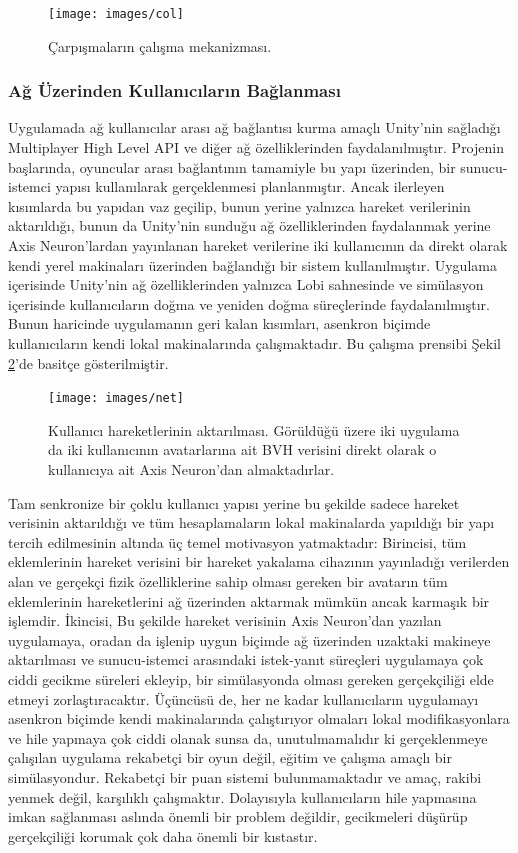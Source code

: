 \documentclass[a4paper, 12pt, titlepage]{article}
\begin{document}
\begin{figure}[ht!]
    \centering
        \texttt{[image: images/col]}
    \caption{Çarpışmaların çalışma mekanizması.}
    \label{col}
\end{figure}

\subsubsection{Ağ Üzerinden Kullanıcıların Bağlanması}
Uygulamada ağ kullanıcılar arası ağ bağlantısı kurma amaçlı Unity’nin sağladığı Multiplayer High
Level API ve diğer ağ özelliklerinden faydalanılmıştır. Projenin başlarında, oyuncular arası
bağlantının tamamiyle bu yapı üzerinden, bir sunucu-istemci yapısı kullanılarak gerçeklenmesi
planlanmıştır. Ancak ilerleyen kısımlarda bu yapıdan vaz geçilip, bunun yerine yalnızca hareket
verilerinin aktarıldığı, bunun da Unity’nin sunduğu ağ özelliklerinden faydalanmak yerine Axis
Neuron’lardan yayınlanan hareket verilerine iki kullanıcının da direkt olarak kendi yerel
makinaları üzerinden bağlandığı bir sistem kullanılmıştır. Uygulama içerisinde Unity’nin ağ
özelliklerinden yalnızca Lobi sahnesinde ve simülasyon içerisinde kullanıcıların doğma ve yeniden
doğma süreçlerinde faydalanılmıştır. Bunun haricinde uygulamanın geri kalan kısımları, asenkron
biçimde kullanıcıların kendi lokal makinalarında çalışmaktadır. Bu çalışma prensibi Şekil
\ref{net}’de basitçe gösterilmiştir.

\begin{figure}[ht!]
    \centering
        \texttt{[image: images/net]}
    \caption{Kullanıcı hareketlerinin aktarılması. Görüldüğü üzere iki uygulama da iki kullanıcının
             avatarlarına ait BVH verisini direkt olarak o kullanıcıya ait Axis Neuron’dan
             almaktadırlar.}
    \label{net}
\end{figure}

Tam senkronize bir çoklu kullanıcı yapısı yerine bu şekilde sadece hareket verisinin aktarıldığı ve
tüm hesaplamaların lokal makinalarda yapıldığı bir yapı tercih edilmesinin altında üç temel
motivasyon yatmaktadır: Birincisi, tüm eklemlerinin hareket verisini bir hareket yakalama cihazının
yayınladığı verilerden alan ve gerçekçi fizik özelliklerine sahip olması gereken bir avatarın tüm
eklemlerinin hareketlerini ağ üzerinden aktarmak mümkün ancak karmaşık bir işlemdir. İkincisi, Bu
şekilde hareket verisinin Axis Neuron’dan yazılan uygulamaya, oradan da işlenip uygun biçimde ağ
üzerinden uzaktaki makineye aktarılması ve sunucu-istemci arasındaki istek-yanıt süreçleri
uygulamaya çok ciddi gecikme süreleri ekleyip, bir simülasyonda olması gereken gerçekçiliği elde
etmeyi zorlaştıracaktır. Üçüncüsü de, her ne kadar kullanıcıların uygulamayı asenkron biçimde kendi
makinalarında çalıştırıyor olmaları lokal modifikasyonlara ve hile yapmaya çok ciddi olanak sunsa
da, unutulmamalıdır ki gerçeklenmeye çalışılan uygulama rekabetçi bir oyun değil, eğitim ve çalışma
amaçlı bir simülasyondur. Rekabetçi bir puan sistemi bulunmamaktadır ve amaç, rakibi yenmek değil,
karşılıklı çalışmaktır. Dolayısıyla kullanıcıların hile yapmasına imkan sağlanması aslında önemli
bir problem değildir, gecikmeleri düşürüp gerçekçiliği korumak çok daha önemli bir kıstastır.
\end{document}
